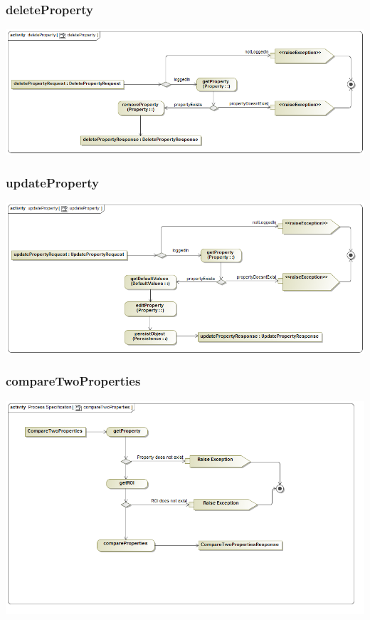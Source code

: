 \documentclass[a4paper,12pt]{article}
\begin{document}
\subsubsection{deleteProperty}
\includegraphics[width=1\textwidth]{./Images/processSpecification/deleteProperty.png}
\subsubsection{updateProperty}
\includegraphics[width=1\textwidth]{./Images/processSpecification/updateProperty.png}
\subsubsection{compareTwoProperties}
\includegraphics[width=1\textwidth]{./Images/processSpecification/compareTwoProperties.png}
\end{document}
